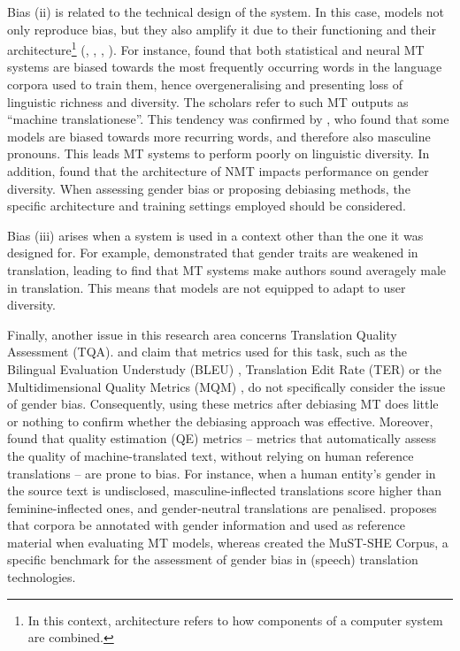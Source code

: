 Bias (ii) is related to the technical design of the system. In this case, models not only reproduce bias, but they also amplify it due to their functioning and their architecture\footnote{In this context, architecture refers to how components of a computer system are combined.} (\cite{vanmassenhove-etal-2019-lost}, \cite{vanmassenhove2021machine}, \cite{costa2020gender}, \cite{roberts2020decoding}). For instance, \textcite{vanmassenhove-etal-2019-lost} found that both statistical and neural MT systems are biased towards the most frequently occurring words in the language corpora used to train them, hence overgeneralising and presenting loss of linguistic richness and diversity. The scholars refer to such MT outputs as ``machine translationese''. This tendency was confirmed by \textcite{roberts2020decoding}, who found that some models are biased towards more recurring words, and therefore also masculine pronouns. This leads MT systems to perform poorly on linguistic diversity. In addition, \textcite{costa2020gender} found that the architecture of NMT impacts performance on gender diversity. When assessing gender bias or proposing debiasing methods, the specific architecture and training settings employed should be considered. 


Bias (iii) arises when a system is used in a context other than the one it was designed for. For example, \textcite{rabinovich-etal-2017-personalized} demonstrated that gender traits are weakened in translation, leading \textcite{hovy2020you} to find that MT systems make authors sound averagely male in translation. This means that models are not equipped to adapt to user diversity.

Finally, another issue in this research area concerns Translation Quality Assessment (TQA). \textcite{bentivogli-etal-2020-gender} and \textcite[465]{monti2020gender} claim that metrics used for this task, such as the Bilingual Evaluation Understudy (BLEU) \citep{papineni2002bleu}, Translation Edit Rate (TER) \citep{snover2006study} or the Multidimensional Quality Metrics (MQM) \citep{lommel2014multidimensional}, do not specifically consider the issue of gender bias. Consequently, using these metrics after debiasing MT does little or nothing to confirm whether the debiasing approach was effective.
Moreover, \textcite{zaranis2024watching} found that quality estimation (QE) metrics -- metrics that automatically assess the quality of machine-translated text, without relying on human reference translations -- are prone to bias. For instance, when a human entity’s gender in the source text is undisclosed, masculine-inflected translations score higher than feminine-inflected ones, and gender-neutral translations are penalised. \textcite[465]{monti2020gender} proposes that corpora be annotated with gender information and used as reference material when evaluating MT models, whereas \textcite{bentivogli-etal-2020-gender} created the MuST-SHE Corpus, a specific benchmark for the assessment of gender bias in (speech) translation technologies.

